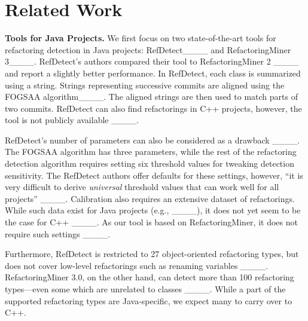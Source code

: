 \section{Related Work}
\noindent\textbf{Tools for Java Projects.} We first focus on two state-of-the-art tools for refactoring detection in Java projects: RefDetect____ and RefactoringMiner 3____. RefDetect's authors compared their tool to RefactoringMiner 2 ____ and report a slightly better performance. In RefDetect, each class is summarized using a string. Strings representing successive commits are aligned using the FOGSAA algorithm____. The aligned strings are then used to match parts of two commits. RefDetect can also find refactorings in C++ projects, however, the tool is not publicly available ____. %

RefDetect's number of parameters can also be considered as a drawback ____. The FOGSAA algorithm has three parameters, while the rest of the refactoring detection algorithm requires setting six threshold values for tweaking detection sensitivity. The RefDetect authors offer defaults for these settings, however, ``it is very difficult to derive \emph{universal} threshold values that can work well for all projects'' ____.
Calibration also requires an extensive dataset of refactorings. While such data exist for Java projects (e.g., ____), it does not yet seem to be the case for C++ ____. %
As our tool is based on RefactoringMiner, it does not require such settings ____.

Furthermore, RefDetect is restricted to 27 object-oriented refactoring types, but does not cover low-level refactorings such as renaming variables ____.
RefactoringMiner 3.0, on the other hand, can detect more than 100 refactoring types---even some which are unrelated to classes ____. While a part of the supported refactoring types are Java-specific, we expect many to carry over to C++.%

